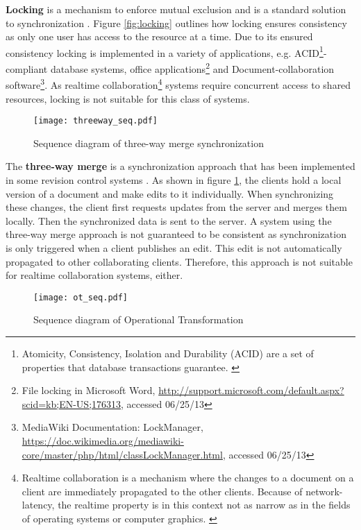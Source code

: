 \textbf{Locking} is a mechanism to enforce mutual exclusion and is a standard solution to synchronization \cite{Dijkstra_1965}. Figure \ref{fig:locking} outlines how locking ensures consistency as only one user has access to the resource at a time. Due to its ensured consistency locking is implemented in a variety of applications, e.g. ACID\footnote{Atomicity, Consistency, Isolation and Durability (ACID) are a set of properties that database transactions guarantee. \cite{Gray_1981}}-compliant database systems, office applications\footnote{File locking in Microsoft Word, \url{http://support.microsoft.com/default.aspx?scid=kb;EN-US;176313}, accessed 06/25/13} and Document-collaboration software\footnote{MediaWiki Documentation: LockManager, \url{https://doc.wikimedia.org/mediawiki-core/master/php/html/classLockManager.html}, accessed 06/25/13}. As realtime collaboration\footnote{Realtime collaboration is a mechanism where the changes to a document on a client are immediately propagated to the other clients. Because of network-latency, the realtime property is in this context not as narrow as in the fields of operating systems or computer graphics. \cite{Sun_2002}} systems require concurrent access to shared resources, locking is not suitable for this class of systems.

\begin{figure}[!h]
\begin{center}
\texttt{[image: threeway\_seq.pdf]}
\caption{Sequence diagram of three-way merge synchronization}
\label{fig:threeway}
\end{center}
\end{figure}

The \textbf{three-way merge} is a synchronization approach that has been implemented in some revision control systems \cite{Pilato_2008}. As shown in figure \ref{fig:threeway}, the clients hold a local version of a document and make edits to it individually. When synchronizing these changes, the client first requests updates from the server and merges them locally. Then the synchronized data is sent to the server. A system using the three-way merge approach is not guaranteed to be consistent as synchronization is only triggered when a client publishes an edit. This edit is not automatically propagated to other collaborating clients. Therefore, this approach is not suitable for realtime collaboration systems, either.

\begin{figure}[!h]
\begin{center}
\texttt{[image: ot\_seq.pdf]}
\caption{Sequence diagram of Operational Transformation}

\label{fig:optr}
\end{center}
\end{figure}

